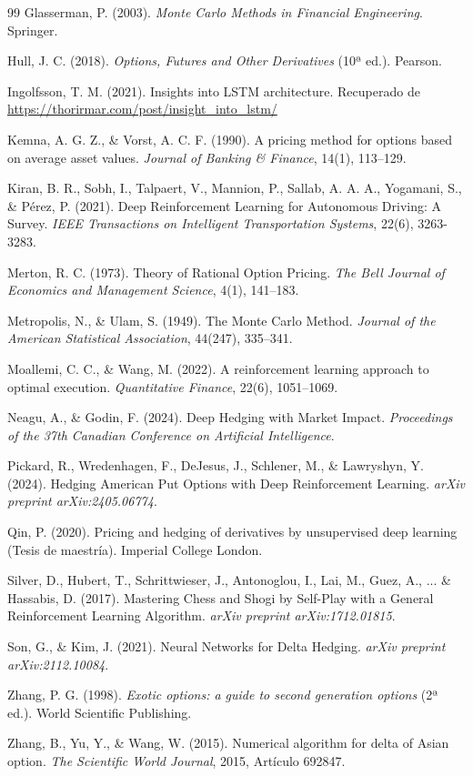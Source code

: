 \documentclass[11pt,a4paper,spanish]{article}
\numberwithin{equation}{section} %
\begin{document}
\begin{thebibliography}{99}
 Glasserman, P. (2003). \textit{Monte Carlo Methods in Financial Engineering}. Springer.

 Hull, J. C. (2018). \textit{Options, Futures and Other Derivatives} (10ª ed.). Pearson.

 Ingolfsson, T. M. (2021). Insights into LSTM architecture. Recuperado de \url{https://thorirmar.com/post/insight_into_lstm/}

 Kemna, A. G. Z., \& Vorst, A. C. F. (1990). A pricing method for options based on average asset values. \textit{Journal of Banking \& Finance}, 14(1), 113–129.

 Kiran, B. R., Sobh, I., Talpaert, V., Mannion, P., Sallab, A. A. A., Yogamani, S., \& Pérez, P. (2021). Deep Reinforcement Learning for Autonomous Driving: A Survey. \textit{IEEE Transactions on Intelligent Transportation Systems}, 22(6), 3263-3283.

 Merton, R. C. (1973). Theory of Rational Option Pricing. \textit{The Bell Journal of Economics and Management Science}, 4(1), 141–183.

 Metropolis, N., \& Ulam, S. (1949). The Monte Carlo Method. \textit{Journal of the American Statistical Association}, 44(247), 335–341.

 Moallemi, C. C., \& Wang, M. (2022). A reinforcement learning approach to optimal execution. \textit{Quantitative Finance}, 22(6), 1051–1069.

 Neagu, A., \& Godin, F. (2024). Deep Hedging with Market Impact. \textit{Proceedings of the 37th Canadian Conference on Artificial Intelligence}.

 Pickard, R., Wredenhagen, F., DeJesus, J., Schlener, M., \& Lawryshyn, Y. (2024). Hedging American Put Options with Deep Reinforcement Learning. \textit{arXiv preprint arXiv:2405.06774}.

 Qin, P. (2020). Pricing and hedging of derivatives by unsupervised deep learning (Tesis de maestría). Imperial College London.

 Silver, D., Hubert, T., Schrittwieser, J., Antonoglou, I., Lai, M., Guez, A., ... \& Hassabis, D. (2017). Mastering Chess and Shogi by Self-Play with a General Reinforcement Learning Algorithm. \textit{arXiv preprint arXiv:1712.01815}.

 Son, G., \& Kim, J. (2021). Neural Networks for Delta Hedging. \textit{arXiv preprint arXiv:2112.10084}.

 Zhang, P. G. (1998). \textit{Exotic options: a guide to second generation options} (2ª ed.). World Scientific Publishing.

 Zhang, B., Yu, Y., \& Wang, W. (2015). Numerical algorithm for delta of Asian option. \textit{The Scientific World Journal}, 2015, Artículo 692847.




\end{thebibliography}
\end{document}
